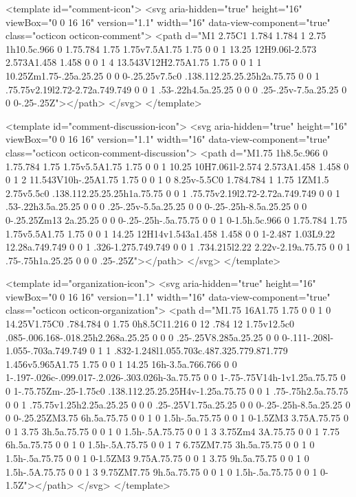 <template id="comment-icon">
  <svg aria-hidden="true" height="16" viewBox="0 0 16 16" version="1.1" width="16" data-view-component="true" class="octicon octicon-comment">
    <path d="M1 2.75C1 1.784 1.784 1 2.75 1h10.5c.966 0 1.75.784 1.75 1.75v7.5A1.75 1.75 0 0 1 13.25 12H9.06l-2.573 2.573A1.458 1.458 0 0 1 4 13.543V12H2.75A1.75 1.75 0 0 1 1 10.25Zm1.75-.25a.25.25 0 0 0-.25.25v7.5c0 .138.112.25.25.25h2a.75.75 0 0 1 .75.75v2.19l2.72-2.72a.749.749 0 0 1 .53-.22h4.5a.25.25 0 0 0 .25-.25v-7.5a.25.25 0 0 0-.25-.25Z"></path>
</svg>
</template>

<template id="comment-discussion-icon">
  <svg aria-hidden="true" height="16" viewBox="0 0 16 16" version="1.1" width="16" data-view-component="true" class="octicon octicon-comment-discussion">
    <path d="M1.75 1h8.5c.966 0 1.75.784 1.75 1.75v5.5A1.75 1.75 0 0 1 10.25 10H7.061l-2.574 2.573A1.458 1.458 0 0 1 2 11.543V10h-.25A1.75 1.75 0 0 1 0 8.25v-5.5C0 1.784.784 1 1.75 1ZM1.5 2.75v5.5c0 .138.112.25.25.25h1a.75.75 0 0 1 .75.75v2.19l2.72-2.72a.749.749 0 0 1 .53-.22h3.5a.25.25 0 0 0 .25-.25v-5.5a.25.25 0 0 0-.25-.25h-8.5a.25.25 0 0 0-.25.25Zm13 2a.25.25 0 0 0-.25-.25h-.5a.75.75 0 0 1 0-1.5h.5c.966 0 1.75.784 1.75 1.75v5.5A1.75 1.75 0 0 1 14.25 12H14v1.543a1.458 1.458 0 0 1-2.487 1.03L9.22 12.28a.749.749 0 0 1 .326-1.275.749.749 0 0 1 .734.215l2.22 2.22v-2.19a.75.75 0 0 1 .75-.75h1a.25.25 0 0 0 .25-.25Z"></path>
</svg>
</template>

<template id="organization-icon">
  <svg aria-hidden="true" height="16" viewBox="0 0 16 16" version="1.1" width="16" data-view-component="true" class="octicon octicon-organization">
    <path d="M1.75 16A1.75 1.75 0 0 1 0 14.25V1.75C0 .784.784 0 1.75 0h8.5C11.216 0 12 .784 12 1.75v12.5c0 .085-.006.168-.018.25h2.268a.25.25 0 0 0 .25-.25V8.285a.25.25 0 0 0-.111-.208l-1.055-.703a.749.749 0 1 1 .832-1.248l1.055.703c.487.325.779.871.779 1.456v5.965A1.75 1.75 0 0 1 14.25 16h-3.5a.766.766 0 0 1-.197-.026c-.099.017-.2.026-.303.026h-3a.75.75 0 0 1-.75-.75V14h-1v1.25a.75.75 0 0 1-.75.75Zm-.25-1.75c0 .138.112.25.25.25H4v-1.25a.75.75 0 0 1 .75-.75h2.5a.75.75 0 0 1 .75.75v1.25h2.25a.25.25 0 0 0 .25-.25V1.75a.25.25 0 0 0-.25-.25h-8.5a.25.25 0 0 0-.25.25ZM3.75 6h.5a.75.75 0 0 1 0 1.5h-.5a.75.75 0 0 1 0-1.5ZM3 3.75A.75.75 0 0 1 3.75 3h.5a.75.75 0 0 1 0 1.5h-.5A.75.75 0 0 1 3 3.75Zm4 3A.75.75 0 0 1 7.75 6h.5a.75.75 0 0 1 0 1.5h-.5A.75.75 0 0 1 7 6.75ZM7.75 3h.5a.75.75 0 0 1 0 1.5h-.5a.75.75 0 0 1 0-1.5ZM3 9.75A.75.75 0 0 1 3.75 9h.5a.75.75 0 0 1 0 1.5h-.5A.75.75 0 0 1 3 9.75ZM7.75 9h.5a.75.75 0 0 1 0 1.5h-.5a.75.75 0 0 1 0-1.5Z"></path>
</svg>
</template>

